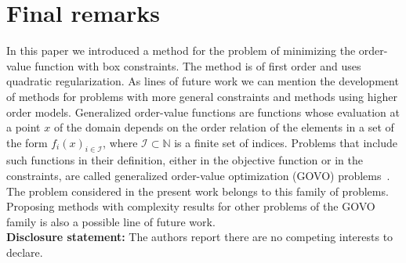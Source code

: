 \documentclass[11pt]{article}
\newcommand{\N}{\mathbb{N}}
\begin{document}
\section{Final remarks} \label{sec:conclu}

In this paper we introduced a method for the problem of minimizing the order-value function with box constraints. The method is of first order and uses quadratic regularization. As lines of future work we can mention the development of methods for problems with more general constraints and methods using higher order models. Generalized order-value functions are functions whose evaluation at a point $x$ of the domain depends on the order relation of the elements in a set of the form ${f_i(x)}_{i \in \mathcal{I}}$, where $\mathcal{I} \subset \N$ is a finite set of indices. Problems that include such functions in their definition, either in the objective function or in the constraints, are called generalized order-value optimization (GOVO) problems~\cite{mtop}. The problem considered in the present work belongs to this family of problems. Proposing methods with complexity results for other problems of the GOVO family is also a possible line of future work.\\

\noindent\textbf{Disclosure statement:} The authors report there are no competing interests to declare.

\end{document}
